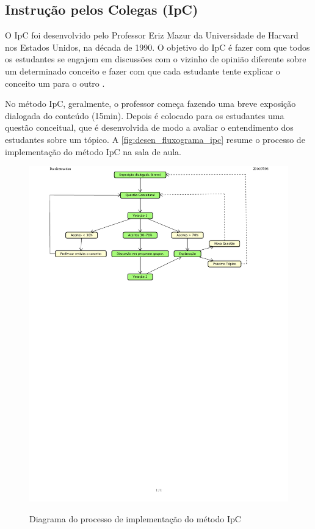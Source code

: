 \subsection{Instrução pelos Colegas (IpC)}
\label{section:ipc}

O IpC foi desenvolvido pelo Professor Eriz Mazur da Universidade de Harvard nos Estados Unidos, na
década de 1990. O objetivo do IpC é fazer com que todos os estudantes se engajem em
discussões com o vizinho de opinião diferente sobre um determinado conceito e fazer com que cada
estudante tente explicar o conceito um para o outro \cite{Mazur2009}.

No método IpC, geralmente, o professor começa fazendo uma breve exposição dialogada do conteúdo (15min).
Depois é colocado para os estudantes uma questão conceitual, que é
desenvolvida de modo a avaliar o entendimento dos estudantes sobre um tópico.
A \autoref{fig:desen_fluxograma_ipc} resume o processo de implementação do método IpC na sala de aula.

\begin{figure}[b]
  \centering
  \caption{Diagrama do processo de implementação do método IpC}
  \includegraphics[clip, trim=0cm 18cm 3cm .4cm, width=.85\textwidth]{imagens/peer_instruction}
  \label{fig:desen_fluxograma_ipc}
\end{figure}

